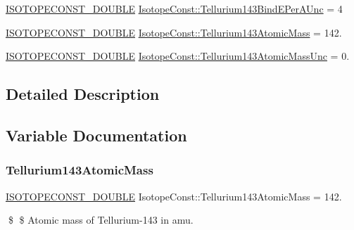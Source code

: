 \begin{DoxyCompactItemize}
\mbox{\hyperlink{group___isotope_const-_macros_ga8f45a7272ce02c0b4c65c44636ed719a}{I\+S\+O\+T\+O\+P\+E\+C\+O\+N\+S\+T\+\_\+\+D\+O\+U\+B\+LE}} \mbox{\hyperlink{group___isotope_const-_tellurium-_te143_gab4f5138dba9b04bc97ff36404bff90c2}{Isotope\+Const\+::\+Tellurium143\+Bind\+E\+Per\+A\+Unc}} = 4
\item 
\mbox{\hyperlink{group___isotope_const-_macros_ga8f45a7272ce02c0b4c65c44636ed719a}{I\+S\+O\+T\+O\+P\+E\+C\+O\+N\+S\+T\+\_\+\+D\+O\+U\+B\+LE}} \mbox{\hyperlink{group___isotope_const-_tellurium-_te143_ga923f1daf556318cef3520e23a91b4e1c}{Isotope\+Const\+::\+Tellurium143\+Atomic\+Mass}} = 142.
\item 
\mbox{\hyperlink{group___isotope_const-_macros_ga8f45a7272ce02c0b4c65c44636ed719a}{I\+S\+O\+T\+O\+P\+E\+C\+O\+N\+S\+T\+\_\+\+D\+O\+U\+B\+LE}} \mbox{\hyperlink{group___isotope_const-_tellurium-_te143_ga34c856ad07e67afcc363b2e7456f30e1}{Isotope\+Const\+::\+Tellurium143\+Atomic\+Mass\+Unc}} = 0.
\end{DoxyCompactItemize}


\subsection{Detailed Description}


\subsection{Variable Documentation}
\mbox{\label{group___isotope_const-_tellurium-_te143_ga923f1daf556318cef3520e23a91b4e1c}} 
\subsubsection{\texorpdfstring{Tellurium143\+Atomic\+Mass}{Tellurium143AtomicMass}}
{\footnotesize\ttfamily \mbox{\hyperlink{group___isotope_const-_macros_ga8f45a7272ce02c0b4c65c44636ed719a}{I\+S\+O\+T\+O\+P\+E\+C\+O\+N\+S\+T\+\_\+\+D\+O\+U\+B\+LE}} Isotope\+Const\+::\+Tellurium143\+Atomic\+Mass = 142.}

\$ \$ Atomic mass of Tellurium-\/143 in amu. \mbox{\label{group___isotope_const-_tellurium-_te143_ga34c856ad07e67afcc363b2e7456f30e1}} 
